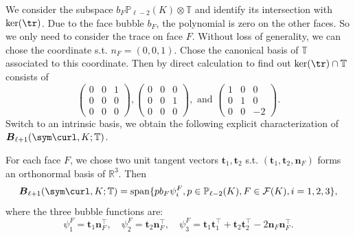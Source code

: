 We consider the subspace $b_F \mathbb P_{\ell-2}(K)\otimes \mathbb T$ and identify its intersection with $\ker(\tr)$. Due to the face bubble $b_F$, the polynomial is zero on the other faces. So we only need to consider the trace on face $F$. Without loss of generality, we can chose the coordinate s.t. $n_F = (0,0,1)$. Chose the canonical basis of $\mathbb T$ associated to this coordinate. Then by direct calculation to find out $\ker(\tr)\cap \mathbb T$ consists of
$$
\begin{pmatrix}
0 & 0 & 1 \\
0 & 0 & 0 \\
0 & 0 & 0
\end{pmatrix},
\begin{pmatrix}
0 & 0 & 0 \\
0 & 0 & 1 \\
0 & 0 & 0
\end{pmatrix},
\text{ and }
\begin{pmatrix}
1 & 0 & 0 \\
0 & 1 & 0 \\
0 & 0 & -2
\end{pmatrix}.
$$
Switch to an intrinsic basis, we obtain the following explicit characterization of $\boldsymbol B_{\ell + 1}(\sym\curl, K;\mathbb T)$.
\begin{lemma}
For each face $F$, we chose two unit tangent vectors $\boldsymbol t_1, \boldsymbol t_2$ s.t. $(\boldsymbol t_1, \boldsymbol t_2, \boldsymbol n_F)$ forms an orthonormal basis of $\mathbb R^3$. Then
\begin{equation}\label{eq:span1}
\boldsymbol B_{\ell+1}(\sym\curl, K;\mathbb T)  = {\rm span}\{ p b_F \psi_i^F, p\in \mathbb P_{\ell-2}(K), F\in \mathcal F(K), i = 1,2,3\},
\end{equation}
where the three bubble functions are:
$$
\psi_1^F = \boldsymbol t_1 \boldsymbol n_F^{\intercal}, \quad \psi_2^F = \boldsymbol t_2 \boldsymbol n_F^{\intercal}, \quad  \psi_3^F = \boldsymbol t_1  \boldsymbol t_1^{\intercal} +  \boldsymbol t_2  \boldsymbol t_2^{\intercal} - 2 \boldsymbol n_F  \boldsymbol n_F^{\intercal}.
$$
\end{lemma}
